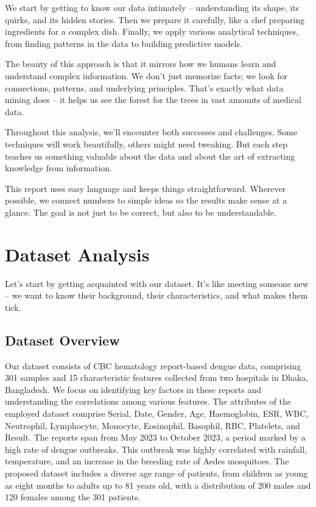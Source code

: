 \documentclass[12pt,a4paper]{article}
\begin{document}
We start by getting to know our data intimately – understanding its shape, its quirks, and its hidden stories. Then we prepare it carefully, like a chef preparing ingredients for a complex dish. Finally, we apply various analytical techniques, from finding patterns in the data to building predictive models.

The beauty of this approach is that it mirrors how we humans learn and understand complex information. We don't just memorize facts; we look for connections, patterns, and underlying principles. That's exactly what data mining does – it helps us see the forest for the trees in vast amounts of medical data.

Throughout this analysis, we'll encounter both successes and challenges. Some techniques will work beautifully, others might need tweaking. But each step teaches us something valuable about the data and about the art of extracting knowledge from information.

This report uses easy language and keeps things straightforward. Wherever possible, we connect numbers to simple ideas so the results make sense at a glance. The goal is not just to be correct, but also to be understandable.

\section{Dataset Analysis}

Let's start by getting acquainted with our dataset. It's like meeting someone new – we want to know their background, their characteristics, and what makes them tick.

\subsection{Dataset Overview}

Our dataset consists of CBC hematology report-based dengue data, comprising 301 samples and 15 characteristic features collected from two hospitals in Dhaka, Bangladesh. We focus on identifying key factors in these reports and understanding the correlations among various features. The attributes of the employed dataset comprise Serial, Date, Gender, Age, Haemoglobin, ESR, WBC, Neutrophil, Lymphocyte, Monocyte, Eosinophil, Basophil, RBC, Platelets, and Result. The reports span from May 2023 to October 2023, a period marked by a high rate of dengue outbreaks. This outbreak was highly correlated with rainfall, temperature, and an increase in the breeding rate of Aedes mosquitoes. The proposed dataset includes a diverse age range of patients, from children as young as eight months to adults up to 81 years old, with a distribution of 200 males and 120 females among the 301 patients.
\end{document}
